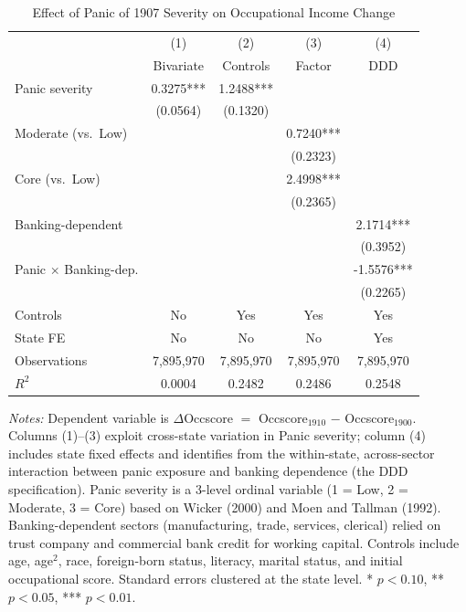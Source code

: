 \begin{table}[H]
\centering
\caption{Effect of Panic of 1907 Severity on Occupational Income Change}
\begin{threeparttable}
\begin{tabular}{lcccc}
\toprule
 & (1) & (2) & (3) & (4) \\
 & Bivariate & Controls & Factor & DDD \\
\midrule
Panic severity & 0.3275*** & 1.2488*** & & \\
 & (0.0564) & (0.1320) & & \\
Moderate (vs.\ Low) & & & 0.7240*** & \\
 & & & (0.2323) & \\
Core (vs.\ Low) & & & 2.4998*** & \\
 & & & (0.2365) & \\
Banking-dependent & & & & 2.1714*** \\
 & & & & (0.3952) \\
Panic $\times$ Banking-dep. & & & & -1.5576*** \\
 & & & & (0.2265) \\
\midrule
Controls & No & Yes & Yes & Yes \\
State FE & No & No & No & Yes \\
Observations & 7,895,970 & 7,895,970 & 7,895,970 & 7,895,970 \\
$R^2$ & 0.0004 & 0.2482 & 0.2486 & 0.2548 \\
\bottomrule
\end{tabular}
\begin{tablenotes}[flushleft]
\small
\item \textit{Notes:} Dependent variable is $\Delta$Occscore $=$ Occscore$_{1910}$ $-$ Occscore$_{1900}$. Columns (1)--(3) exploit cross-state variation in Panic severity; column (4) includes state fixed effects and identifies from the within-state, across-sector interaction between panic exposure and banking dependence (the DDD specification). Panic severity is a 3-level ordinal variable (1 = Low, 2 = Moderate, 3 = Core) based on Wicker (2000) and Moen and Tallman (1992). Banking-dependent sectors (manufacturing, trade, services, clerical) relied on trust company and commercial bank credit for working capital. Controls include age, age$^2$, race, foreign-born status, literacy, marital status, and initial occupational score. Standard errors clustered at the state level. * $p<0.10$, ** $p<0.05$, *** $p<0.01$.
\end{tablenotes}
\end{threeparttable}
\label{tab:main}
\end{table}

